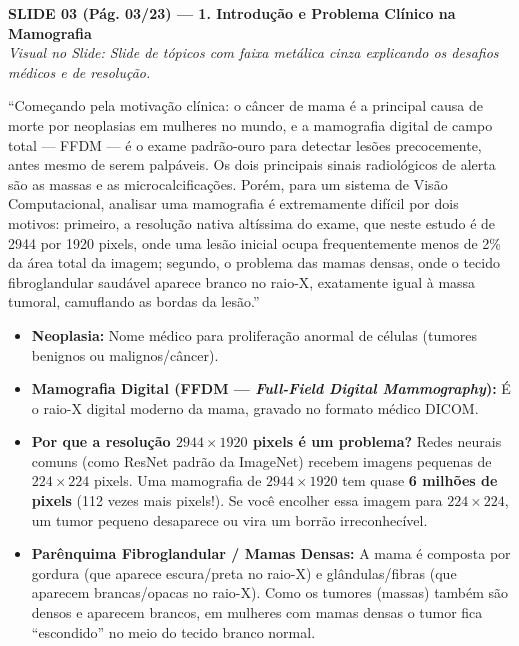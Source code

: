 \documentclass[11pt,a4paper]{article}
\newcommand{\slideheader}[3]{%
    \vspace{10pt}%
    \begin{tcolorbox}[colback=slateborder, colframe=slateborder, coltext=white, boxrule=0pt, arc=3pt, left=8pt, right=8pt, top=5pt, bottom=5pt]
        {\large\bfseries #1 — #2}\\[2pt]
        {\small\itshape Visual no Slide: #3}
    \end{tcolorbox}%
}
\newenvironment{falabox}{%
    \begin{tcolorbox}[colback=speechbg, colframe=speechborder, boxrule=1.2pt, arc=4pt, left=10pt, right=10pt, top=8pt, bottom=8pt, title={\bfseries O QUE VOCÊ DEVE FALAR (Fala Sugerida)}]%
}{%
    \end{tcolorbox}%
}
\newenvironment{explicabox}{%
    \begin{tcolorbox}[colback=explainbg, colframe=explainborder, boxrule=0.8pt, arc=4pt, left=10pt, right=10pt, top=8pt, bottom=8pt, title={\bfseries ENTENDA O QUE VOCÊ ESTÁ FALANDO (Explicação Didática de Cada Termo)}]%
}{%
    \end{tcolorbox}%
}
\begin{document}
\newpage
\slideheader{SLIDE 03 (Pág. 03/23)}{1. Introdução e Problema Clínico na Mamografia}{Slide de tópicos com faixa metálica cinza explicando os desafios médicos e de resolução.}

\begin{falabox}
``Começando pela motivação clínica: o câncer de mama é a principal causa de morte por neoplasias em mulheres no mundo, e a mamografia digital de campo total — FFDM — é o exame padrão-ouro para detectar lesões precocemente, antes mesmo de serem palpáveis. Os dois principais sinais radiológicos de alerta são as massas e as microcalcificações. Porém, para um sistema de Visão Computacional, analisar uma mamografia é extremamente difícil por dois motivos: primeiro, a resolução nativa altíssima do exame, que neste estudo é de 2944 por 1920 pixels, onde uma lesão inicial ocupa frequentemente menos de 2\% da área total da imagem; segundo, o problema das mamas densas, onde o tecido fibroglandular saudável aparece branco no raio-X, exatamente igual à massa tumoral, camuflando as bordas da lesão.''
\end{falabox}

\begin{explicabox}
\begin{itemize}[leftmargin=*, itemsep=4pt]
    \item \textbf{Neoplasia:} Nome médico para proliferação anormal de células (tumores benignos ou malignos/câncer).
    \item \textbf{Mamografia Digital (FFDM — \textit{Full-Field Digital Mammography}):} É o raio-X digital moderno da mama, gravado no formato médico DICOM.
    \item \textbf{Por que a resolução $2944 \times 1920$ pixels é um problema?} Redes neurais comuns (como ResNet padrão da ImageNet) recebem imagens pequenas de $224 \times 224$ pixels. Uma mamografia de $2944 \times 1920$ tem quase \textbf{6 milhões de pixels} (112 vezes mais pixels!). Se você encolher essa imagem para $224 \times 224$, um tumor pequeno desaparece ou vira um borrão irreconhecível.
    \item \textbf{Parênquima Fibroglandular / Mamas Densas:} A mama é composta por gordura (que aparece escura/preta no raio-X) e glândulas/fibras (que aparecem brancas/opacas no raio-X). Como os tumores (massas) também são densos e aparecem brancos, em mulheres com mamas densas o tumor fica ``escondido'' no meio do tecido branco normal.
\end{itemize}
\end{explicabox}
\end{document}
